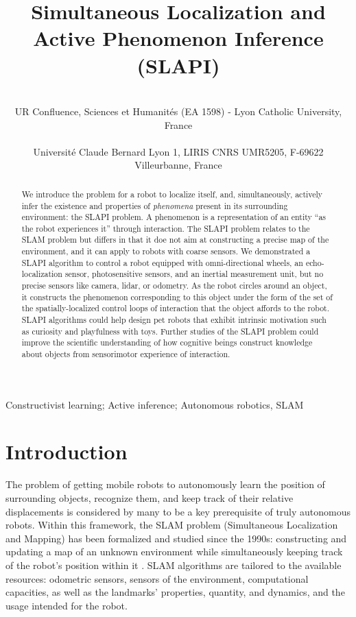 \documentclass[pmlr]{jmlr}%
\title[SLAPI]{Simultaneous Localization and Active Phenomenon Inference (SLAPI)}
\author{\Name{Olivier L. Georgeon} \Email{ogeorgeon@univ-catholyon.fr}\\
  \addr UR Confluence, Sciences et Humanités (EA 1598) - Lyon Catholic University, France\\
  \Name{Titouan Knockaert} \Email{titouan.knockaert@gmail.com}\\
  \addr Université Claude Bernard Lyon 1, LIRIS CNRS UMR5205, F-69622 Villeurbanne, France
}
\begin{document}
\maketitle

\begin{abstract}
We introduce the problem for a robot to  localize itself, and, simultaneously, actively infer the existence and properties of \textit{phenomena} present in its surrounding environment: the SLAPI problem. 
A phenomenon is a representation of an entity ``as the robot experiences it'' through interaction. 
The SLAPI problem relates to the SLAM problem but differs in that it doe not aim at constructing a precise map of the environment, and it can apply to robots with coarse sensors. 
We demonstrated a SLAPI algorithm to control a robot equipped with omni-directional wheels, an echo-localization sensor, photosensitive sensors, and an inertial measurement unit, but no precise sensors like camera, lidar, or odometry. 
As the robot circles around an object, it constructs the phenomenon corresponding to this object under the form of the set of the spatially-localized control loops of interaction that the object affords to the robot. 
SLAPI algorithms could help design pet robots that exhibit intrinsic motivation such as curiosity and playfulness with toys. 
Further studies of the SLAPI problem could improve the scientific understanding of how cognitive beings construct knowledge about objects from sensorimotor experience of interaction.
\end{abstract}

\begin{keywords}
Constructivist learning; Active inference; Autonomous robotics, SLAM
\end{keywords}

\section{Introduction}
\label{sec:intro}

The problem of getting mobile robots to autonomously learn the position of surrounding objects, recognize them, and keep track of their relative displacements is considered by many to be a key prerequisite of truly autonomous robots. 
Within this framework, the SLAM problem (Simultaneous Localization and Mapping) has been formalized and studied since the 1990s: constructing and updating a map of an unknown environment while simultaneously keeping track of the robot's position within it \citep[e.g.,][]{taketomi_visual_2017}.
SLAM algorithms are tailored to the available resources: odometric sensors, sensors of the environment, computational capacities, as well as the landmarks' properties, quantity, and dynamics, and the usage intended for the robot.
\end{document}
